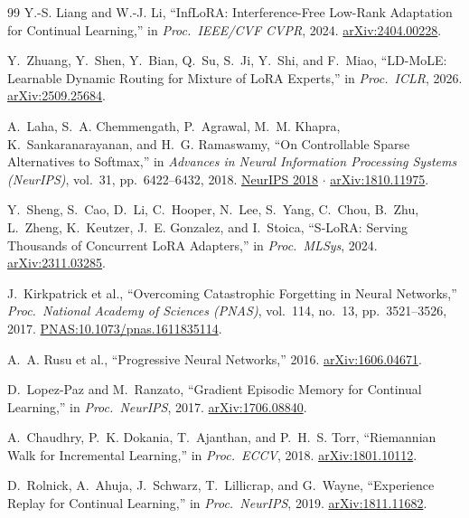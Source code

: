 \documentclass[10pt,a4paper]{article}
\begin{document}
\begin{thebibliography}{99}
Y.-S. Liang and W.-J. Li, ``InfLoRA: Interference-Free Low-Rank Adaptation for Continual Learning,'' in \textit{Proc.\ IEEE/CVF CVPR}, 2024. \href{https://arxiv.org/abs/2404.00228}{arXiv:2404.00228}.

Y.~Zhuang, Y.~Shen, Y.~Bian, Q.~Su, S.~Ji, Y.~Shi, and F.~Miao, ``LD-MoLE: Learnable Dynamic Routing for Mixture of LoRA Experts,'' in \textit{Proc.\ ICLR}, 2026. \href{https://arxiv.org/abs/2509.25684}{arXiv:2509.25684}.

A.~Laha, S.~A. Chemmengath, P.~Agrawal, M.~M. Khapra, K.~Sankaranarayanan, and H.~G. Ramaswamy, ``On Controllable Sparse Alternatives to Softmax,'' in \textit{Advances in Neural Information Processing Systems (NeurIPS)}, vol.~31, pp.~6422--6432, 2018. \href{https://proceedings.neurips.cc/paper/2018/hash/6a4d5952d4c018a1c1af9fa590a10dda-Abstract.html}{NeurIPS 2018} $\cdot$ \href{https://arxiv.org/abs/1810.11975}{arXiv:1810.11975}.

Y.~Sheng, S.~Cao, D.~Li, C.~Hooper, N.~Lee, S.~Yang, C.~Chou, B.~Zhu, L.~Zheng, K.~Keutzer, J.~E. Gonzalez, and I.~Stoica, ``S-LoRA: Serving Thousands of Concurrent LoRA Adapters,'' in \textit{Proc.\ MLSys}, 2024. \href{https://arxiv.org/abs/2311.03285}{arXiv:2311.03285}.

J.~Kirkpatrick et al., ``Overcoming Catastrophic Forgetting in Neural Networks,'' \textit{Proc.\ National Academy of Sciences (PNAS)}, vol.~114, no.~13, pp.~3521--3526, 2017. \href{https://www.pnas.org/doi/10.1073/pnas.1611835114}{PNAS:10.1073/pnas.1611835114}.

A.~A. Rusu et al., ``Progressive Neural Networks,'' 2016. \href{https://arxiv.org/abs/1606.04671}{arXiv:1606.04671}.

D.~Lopez-Paz and M.~Ranzato, ``Gradient Episodic Memory for Continual Learning,'' in \textit{Proc.\ NeurIPS}, 2017. \href{https://arxiv.org/abs/1706.08840}{arXiv:1706.08840}.

A.~Chaudhry, P.~K. Dokania, T.~Ajanthan, and P.~H.~S. Torr, ``Riemannian Walk for Incremental Learning,'' in \textit{Proc.\ ECCV}, 2018. \href{https://arxiv.org/abs/1801.10112}{arXiv:1801.10112}.

D.~Rolnick, A.~Ahuja, J.~Schwarz, T.~Lillicrap, and G.~Wayne, ``Experience Replay for Continual Learning,'' in \textit{Proc.\ NeurIPS}, 2019. \href{https://arxiv.org/abs/1811.11682}{arXiv:1811.11682}.


\end{thebibliography}
\end{document}
